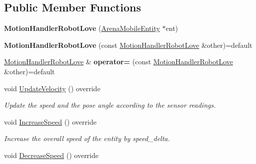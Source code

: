 \subsection*{Public Member Functions}
\begin{DoxyCompactItemize}
\item 
{\bfseries Motion\+Handler\+Robot\+Love} (\hyperlink{class_arena_mobile_entity}{Arena\+Mobile\+Entity} $\ast$ent)\hypertarget{class_motion_handler_robot_love_aa2e0d7f03281a230f095d825ab2b35c6}{}\label{class_motion_handler_robot_love_aa2e0d7f03281a230f095d825ab2b35c6}

\item 
{\bfseries Motion\+Handler\+Robot\+Love} (const \hyperlink{class_motion_handler_robot_love}{Motion\+Handler\+Robot\+Love} \&other)=default\hypertarget{class_motion_handler_robot_love_a547d8a567954d2b82ef8e5f30f1c9515}{}\label{class_motion_handler_robot_love_a547d8a567954d2b82ef8e5f30f1c9515}

\item 
\hyperlink{class_motion_handler_robot_love}{Motion\+Handler\+Robot\+Love} \& {\bfseries operator=} (const \hyperlink{class_motion_handler_robot_love}{Motion\+Handler\+Robot\+Love} \&other)=default\hypertarget{class_motion_handler_robot_love_a5a281795ebc5df70d5529fc012bc4aa5}{}\label{class_motion_handler_robot_love_a5a281795ebc5df70d5529fc012bc4aa5}

\item 
void \hyperlink{class_motion_handler_robot_love_a3d4030e29ee33bbd4cddfc9850543615}{Update\+Velocity} () override\hypertarget{class_motion_handler_robot_love_a3d4030e29ee33bbd4cddfc9850543615}{}\label{class_motion_handler_robot_love_a3d4030e29ee33bbd4cddfc9850543615}

\begin{DoxyCompactList}\small\item\em Update the speed and the pose angle according to the sensor readings. \end{DoxyCompactList}\item 
void \hyperlink{class_motion_handler_robot_love_ac4b0287075f1ec75e9b1bb776eb428f6}{Increase\+Speed} () override\hypertarget{class_motion_handler_robot_love_ac4b0287075f1ec75e9b1bb776eb428f6}{}\label{class_motion_handler_robot_love_ac4b0287075f1ec75e9b1bb776eb428f6}

\begin{DoxyCompactList}\small\item\em Increase the overall speed of the entity by speed\+\_\+delta. \end{DoxyCompactList}\item 
void \hyperlink{class_motion_handler_robot_love_af64d850f198beaccdc9dad1a519c387c}{Decrease\+Speed} () override\hypertarget{class_motion_handler_robot_love_af64d850f198beaccdc9dad1a519c387c}{}\label{class_motion_handler_robot_love_af64d850f198beaccdc9dad1a519c387c}


\end{DoxyCompactItemize}

